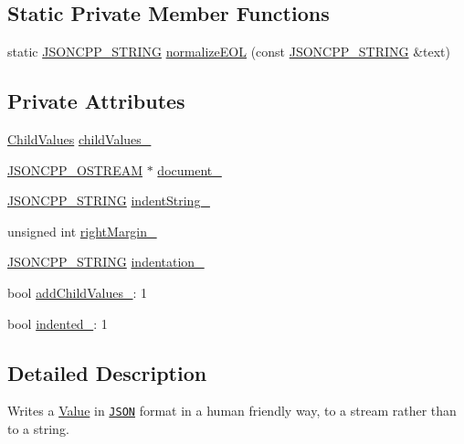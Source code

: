 \subsection*{Static Private Member Functions}
\begin{DoxyCompactItemize}
\item 
static \hyperlink{json_8h_a1e723f95759de062585bc4a8fd3fa4be}{J\+S\+O\+N\+C\+P\+P\+\_\+\+S\+T\+R\+I\+NG} \hyperlink{class_json_1_1_styled_stream_writer_ae481322d7a439881b257ba7aeda6d19b}{normalize\+E\+OL} (const \hyperlink{json_8h_a1e723f95759de062585bc4a8fd3fa4be}{J\+S\+O\+N\+C\+P\+P\+\_\+\+S\+T\+R\+I\+NG} \&text)
\end{DoxyCompactItemize}
\subsection*{Private Attributes}
\begin{DoxyCompactItemize}
\item 
\hyperlink{class_json_1_1_styled_stream_writer_a259bf9d99847b2ea64ec9c6dd441944e}{Child\+Values} \hyperlink{class_json_1_1_styled_stream_writer_aafd62e00a401df73fcacb2e410114b3d}{child\+Values\+\_\+}
\item 
\hyperlink{json_8h_a37a25be5fca174927780caeb280094ce}{J\+S\+O\+N\+C\+P\+P\+\_\+\+O\+S\+T\+R\+E\+AM} $\ast$ \hyperlink{class_json_1_1_styled_stream_writer_aa8c4e4576f5c3dcb10955d133a092dd6}{document\+\_\+}
\item 
\hyperlink{json_8h_a1e723f95759de062585bc4a8fd3fa4be}{J\+S\+O\+N\+C\+P\+P\+\_\+\+S\+T\+R\+I\+NG} \hyperlink{class_json_1_1_styled_stream_writer_a1481433ebe1491ea83b0beb92aed56c2}{indent\+String\+\_\+}
\item 
unsigned int \hyperlink{class_json_1_1_styled_stream_writer_a94299ec0a9bb925b2dbbab7c1f2b390a}{right\+Margin\+\_\+}
\item 
\hyperlink{json_8h_a1e723f95759de062585bc4a8fd3fa4be}{J\+S\+O\+N\+C\+P\+P\+\_\+\+S\+T\+R\+I\+NG} \hyperlink{class_json_1_1_styled_stream_writer_aa45d8fb4ca82d0550be9042012303713}{indentation\+\_\+}
\item 
bool \hyperlink{class_json_1_1_styled_stream_writer_a4e4bb7fc223b2652b72b523b1ce414fa}{add\+Child\+Values\+\_\+}\+: 1
\item 
bool \hyperlink{class_json_1_1_styled_stream_writer_aa12db1753619a9b48da41f3e45e3275d}{indented\+\_\+}\+: 1
\end{DoxyCompactItemize}


\subsection{Detailed Description}
Writes a \hyperlink{class_json_1_1_value}{Value} in \href{http://www.json.org}{\tt J\+S\+ON} format in a human friendly way, to a stream rather than to a string. 

